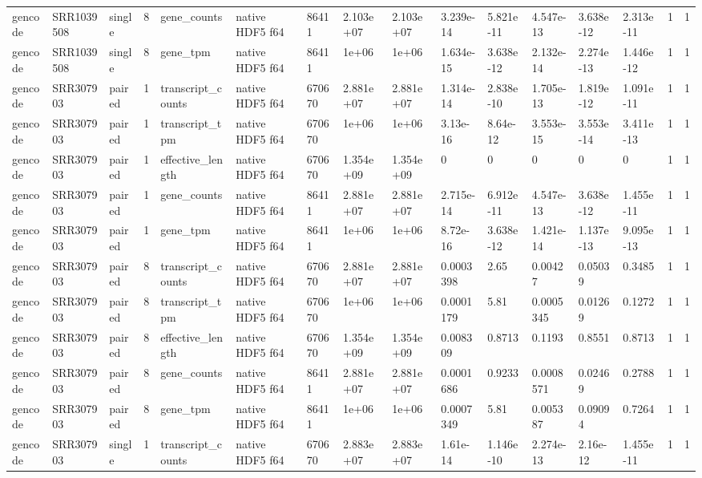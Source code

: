 \begin{tabular}{llllllllllllllll}
gencode & SRR1039508 & single & 8 & gene\_counts & native HDF5 f64 & 86411 & 2.103e+07 & 2.103e+07 & 3.239e-14 & 5.821e-11 & 4.547e-13 & 3.638e-12 & 2.313e-11 & 1 & 1 \\
gencode & SRR1039508 & single & 8 & gene\_tpm & native HDF5 f64 & 86411 & 1e+06 & 1e+06 & 1.634e-15 & 3.638e-12 & 2.132e-14 & 2.274e-13 & 1.446e-12 & 1 & 1 \\
gencode & SRR307903 & paired & 1 & transcript\_counts & native HDF5 f64 & 670670 & 2.881e+07 & 2.881e+07 & 1.314e-14 & 2.838e-10 & 1.705e-13 & 1.819e-12 & 1.091e-11 & 1 & 1 \\
gencode & SRR307903 & paired & 1 & transcript\_tpm & native HDF5 f64 & 670670 & 1e+06 & 1e+06 & 3.13e-16 & 8.64e-12 & 3.553e-15 & 3.553e-14 & 3.411e-13 & 1 & 1 \\
gencode & SRR307903 & paired & 1 & effective\_length & native HDF5 f64 & 670670 & 1.354e+09 & 1.354e+09 & 0 & 0 & 0 & 0 & 0 & 1 & 1 \\
gencode & SRR307903 & paired & 1 & gene\_counts & native HDF5 f64 & 86411 & 2.881e+07 & 2.881e+07 & 2.715e-14 & 6.912e-11 & 4.547e-13 & 3.638e-12 & 1.455e-11 & 1 & 1 \\
gencode & SRR307903 & paired & 1 & gene\_tpm & native HDF5 f64 & 86411 & 1e+06 & 1e+06 & 8.72e-16 & 3.638e-12 & 1.421e-14 & 1.137e-13 & 9.095e-13 & 1 & 1 \\
gencode & SRR307903 & paired & 8 & transcript\_counts & native HDF5 f64 & 670670 & 2.881e+07 & 2.881e+07 & 0.0003398 & 2.65 & 0.00427 & 0.05039 & 0.3485 & 1 & 1 \\
gencode & SRR307903 & paired & 8 & transcript\_tpm & native HDF5 f64 & 670670 & 1e+06 & 1e+06 & 0.0001179 & 5.81 & 0.0005345 & 0.01269 & 0.1272 & 1 & 1 \\
gencode & SRR307903 & paired & 8 & effective\_length & native HDF5 f64 & 670670 & 1.354e+09 & 1.354e+09 & 0.008309 & 0.8713 & 0.1193 & 0.8551 & 0.8713 & 1 & 1 \\
gencode & SRR307903 & paired & 8 & gene\_counts & native HDF5 f64 & 86411 & 2.881e+07 & 2.881e+07 & 0.0001686 & 0.9233 & 0.0008571 & 0.02469 & 0.2788 & 1 & 1 \\
gencode & SRR307903 & paired & 8 & gene\_tpm & native HDF5 f64 & 86411 & 1e+06 & 1e+06 & 0.0007349 & 5.81 & 0.005387 & 0.09094 & 0.7264 & 1 & 1 \\
gencode & SRR307903 & single & 1 & transcript\_counts & native HDF5 f64 & 670670 & 2.883e+07 & 2.883e+07 & 1.61e-14 & 1.146e-10 & 2.274e-13 & 2.16e-12 & 1.455e-11 & 1 & 1 \\

\end{tabular}
